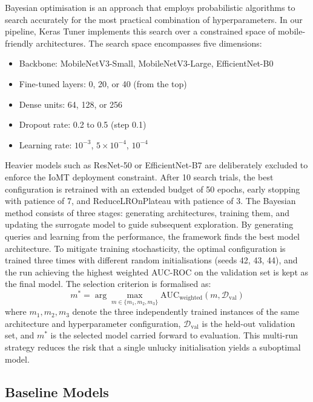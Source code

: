 \documentclass[conference]{IEEEtran}
\begin{document}
Bayesian optimisation is an approach that employs probabilistic algorithms to search accurately for the most practical combination of hyperparameters. In our pipeline, Keras Tuner implements this search over a constrained space of mobile-friendly architectures. The search space encompasses five dimensions:
\begin{itemize}
    \item Backbone: MobileNetV3-Small, MobileNetV3-Large, EfficientNet-B0
    \item Fine-tuned layers: 0, 20, or 40 (from the top)
    \item Dense units: 64, 128, or 256
    \item Dropout rate: 0.2 to 0.5 (step 0.1)
    \item Learning rate: $10^{-3}$, $5 \times 10^{-4}$, $10^{-4}$
\end{itemize}
Heavier models such as ResNet-50 or EfficientNet-B7 are deliberately excluded to enforce the IoMT deployment constraint. After 10 search trials, the best configuration is retrained with an extended budget of 50 epochs, early stopping with patience of 7, and ReduceLROnPlateau with patience of 3. The Bayesian method consists of three stages: generating architectures, training them, and updating the surrogate model to guide subsequent exploration. By generating queries and learning from the performance, the framework finds the best model architecture. To mitigate training stochasticity, the optimal configuration is trained three times with different random initialisations (seeds 42, 43, 44), and the run achieving the highest weighted AUC-ROC on the validation set is kept as the final model. The selection criterion is formalised as:
\begin{equation}
m^{*} = \arg\max_{m \in \{m_1, m_2, m_3\}} \text{AUC}_{\text{weighted}}(m, \mathcal{D}_{\text{val}})
\label{eq:model_select}
\end{equation}
where $m_1, m_2, m_3$ denote the three independently trained instances of the same architecture and hyperparameter configuration, $\mathcal{D}_{\text{val}}$ is the held-out validation set, and $m^{*}$ is the selected model carried forward to evaluation. This multi-run strategy reduces the risk that a single unlucky initialisation yields a suboptimal model.
 
\subsection{Baseline Models}
 
\end{document}
